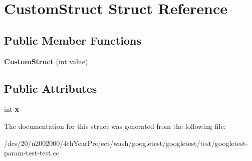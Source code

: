 \hypertarget{structCustomStruct}{}\section{Custom\+Struct Struct Reference}
\label{structCustomStruct}
\subsection*{Public Member Functions}
\begin{DoxyCompactItemize}
\item 
\mbox{\label{structCustomStruct_aeab194957ba9e056e81c721e83c61941}} 
{\bfseries Custom\+Struct} (int value)
\end{DoxyCompactItemize}
\subsection*{Public Attributes}
\begin{DoxyCompactItemize}
\item 
\mbox{\label{structCustomStruct_a436b0c2ffdab1f711fa40cfa3e246602}} 
int {\bfseries x}
\end{DoxyCompactItemize}


The documentation for this struct was generated from the following file\+:\begin{DoxyCompactItemize}
\item 
/dcs/20/u2002000/4th\+Year\+Project/wash/googletest/googletest/test/googletest-\/param-\/test-\/test.\+cc\end{DoxyCompactItemize}
